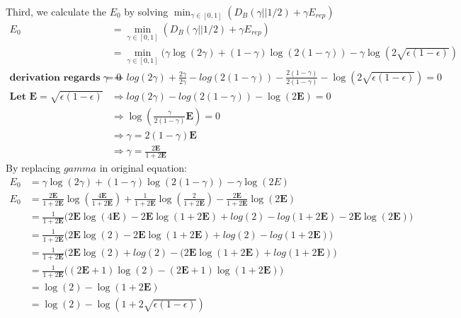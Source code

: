\documentclass[
  course = {{EE623 Information Theory}},
  quartile = {{4}},
  assignment = 8,
  name = {{Mohammad Mahdi Rahimi}},
  studentnumber = {{20208244}},
  email = {{mahi@kaist.ac.kr}},
  firstexercise = 1
]{aga-homework}
\begin{document}
Third, we calculate the $E_0$ by solving $\min_{\gamma \in [0,1]}(D_B(\gamma || 1/2) + \gamma E_{rep})$
\begin{equation} \label{eq8}
\begin{split}
E_0 & = \min_{\gamma \in [0,1]}(D_B(\gamma || 1/2) + \gamma E_{rep})\\
& = \min_{\gamma \in [0,1]}(\gamma \log(2\gamma) + (1-\gamma) \log(2(1-\gamma)) -\gamma\log{(2\sqrt{\epsilon(1 - \epsilon)})} \\
\textbf{derivation regards to $\gamma$} = 0 & \Rightarrow log(2\gamma) + \frac{2\gamma}{2\gamma} - log(2(1-\gamma)) - \frac{2(1-\gamma)}{2(1-\gamma)} - \log{(2\sqrt{\epsilon(1 - \epsilon)})} = 0\\
\textbf{Let } \mathbf{E} = \sqrt{\epsilon(1 - \epsilon)} & \Rightarrow log(2\gamma) - log(2(1-\gamma)) - \log(2\mathbf{E}) = 0\\
& \Rightarrow \log(\frac{\gamma}{2(1-\gamma)}\mathbf{E}) = 0\\
& \Rightarrow \gamma = 2(1-\gamma)\mathbf{E}\\
& \Rightarrow \gamma = \frac{2\mathbf{E}}{1 + 2\mathbf{E}}
\end{split}
\end{equation}
By replacing $gamma$ in original equation:
\begin{equation} \label{eq9}
\begin{split}
E_0 & = \gamma \log(2\gamma) + (1-\gamma) \log(2(1-\gamma)) -\gamma\log{(2E)} \\
E_0 & = \frac{2\mathbf{E}}{1 + 2\mathbf{E}} \log(\frac{4\mathbf{E}}{1 + 2\mathbf{E}}) + \frac{1}{1 + 2\mathbf{E}} \log(\frac{2}{1 + 2\mathbf{E}}) -\frac{2\mathbf{E}}{1 + 2\mathbf{E}}\log{(2\mathbf{E})} \\
& = \frac{1}{1 + 2\mathbf{E}}\Big(2\mathbf{E}\log(4\mathbf{E}) - 2\mathbf{E}\log(1 + 2\mathbf{E}) + log(2) - log(1 + 2\mathbf{E}) - 2\mathbf{E}\log(2\mathbf{E})\Big)\\
& = \frac{1}{1 + 2\mathbf{E}}\Big(2\mathbf{E}\log(2) - 2\mathbf{E}\log(1 + 2\mathbf{E}) + log(2) - log(1 + 2\mathbf{E})\Big)\\
& = \frac{1}{1 + 2\mathbf{E}}\Big(2\mathbf{E}\log(2) + log(2) - (2\mathbf{E}\log(1 + 2\mathbf{E}) + log(1 + 2\mathbf{E})\Big)\\
& = \frac{1}{1 + 2\mathbf{E}}\Big((2\mathbf{E} + 1)\log(2) - (2\mathbf{E} + 1)\log(1 + 2\mathbf{E})\Big)\\
& = \log(2) - \log(1 + 2\mathbf{E})\\
& = \log(2) - \log(1 + 2\sqrt{\epsilon(1 - \epsilon)})\\
\end{split}
\end{equation}
\end{document}
